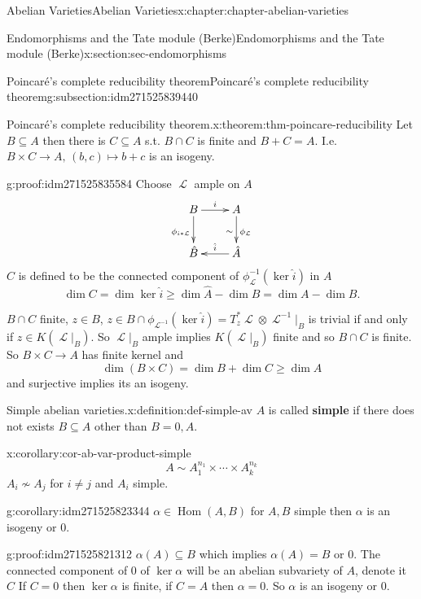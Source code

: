 \documentclass[oneside,10pt,]{book}
\newcommand{\terminology}[1]{\textbf{#1}}
\numberwithin{equation}{section}
\newcommand{\sheaf}[1]{\operatorname{\mathcal{#1}}}
\DeclareMathOperator{\Hom}{Hom}
\begin{document}
\begin{chapterptx}{Abelian Varieties}{}{Abelian Varieties}{}{}{x:chapter:chapter-abelian-varieties}
\begin{sectionptx}{Endomorphisms and the Tate module (Berke)}{}{Endomorphisms and the Tate module (Berke)}{}{}{x:section:sec-endomorphisms}
\begin{subsectionptx}{Poincaré's complete reducibility theorem}{}{Poincaré's complete reducibility theorem}{}{}{g:subsection:idm271525839440}
\begin{theorem}{Poincaré's complete reducibility theorem.}{}{x:theorem:thm-poincare-reducibility}
Let \(B\subseteq A\) then there is \(C\subseteq A\) s.t. \(B \cap C\) is finite and \(B+C = A\). I.e. \(B\times C \to A,\,(b,c) \mapsto b+c\) is an isogeny.%
\end{theorem}
\begin{proofptx}{}{g:proof:idm271525835584}
Choose \(\sheaf L\) ample on \(A\)%
\begin{equation*}
\xymatrix{
B\ar[r]^i \ar[d]_{\phi_{i*\sheaf L}} & A \ar[d]_\sim^{\phi_{\sheaf L}} \\
\hat B & \hat A \ar[l]_{\hat i}
}
\end{equation*}
\(C\) is defined to be the connected component of \(\phi^{-1}_{\sheaf L}(\ker \hat i)\) in \(A\)%
\begin{equation*}
\dim C = \dim \ker \hat i \ge \dim \hat A - \dim \hat B = \dim A - \dim B\text{.}
\end{equation*}
%
\par
\(B \cap C\) finite, \(z\in B\), \(z\in B\cap \phi_{\sheaf L^{-1}} (\ker \hat i) = T_z^* \sheaf L \otimes \sheaf L^{-1} |_B\) is trivial if and only if \(z\in K(\sheaf L|_B)\). So \(\sheaf L|_B\) ample implies \(K(\sheaf L|_B)\) finite and so \(B\cap C\) is finite. So \(B\times C \to A\) has finite kernel and%
\begin{equation*}
\dim (B\times C) = \dim B + \dim C \ge \dim A
\end{equation*}
and surjective implies its an isogeny.%
\end{proofptx}
\begin{definition}{Simple abelian varieties.}{x:definition:def-simple-av}%
\(A\) is called \terminology{simple} if there does not exists \(B\subseteq A\) other than \(B = 0,A\).%
\end{definition}
\begin{corollary}{}{}{x:corollary:cor-ab-var-product-simple}%
%
\begin{equation*}
A \sim A_1^{n_1} \times \cdots \times A_k^{n_k}
\end{equation*}
\(A_i \not\sim A_j\) for \(i\ne j\) and \(A_i\) simple.%
\end{corollary}
\begin{corollary}{}{}{g:corollary:idm271525823344}%
\(\alpha \in \Hom(A,B)\) for \(A,B\) simple then \(\alpha\) is an isogeny or \(0\).%
\end{corollary}
\begin{proofptx}{}{g:proof:idm271525821312}
\(\alpha(A) \subseteq B\) which implies \(\alpha(A)  = B\) or \(0\). The connected component of 0 of \(\ker \alpha\) will be an abelian subvariety of \(A\), denote it \(C\) If \(C = 0\) then \(\ker \alpha\) is finite, if \(C = A\) then \(\alpha = 0\). So \(\alpha\) is an isogeny or \(0\).%

\end{proofptx}
\end{subsectionptx}
\end{sectionptx}
\end{chapterptx}
\end{document}
